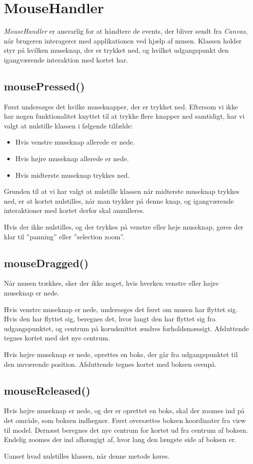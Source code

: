 \section{MouseHandler}
\emph{MouseHandler} er ansvarlig for at håndtere de events, der bliver sendt fra \emph{Canvas}, når brugeren interagerer med applikationen ved hjælp af musen. Klassen holder styr på hvilken museknap, der er trykket ned, og hvilket udgangspunkt den igangværende interaktion med kortet har.

\subsection{mousePressed()}
Først undersøges det hvilke museknapper, der er trykket ned. Eftersom vi ikke har nogen funktionalitet knyttet til at trykke flere knapper ned samtidigt, har vi valgt at nulstille klassen i følgende tilfælde:

\begin{itemize}
	\item Hvis venstre museknap allerede er nede.
	\item Hvis højre museknap allerede er nede.
	\item Hvis midterste museknap trykkes ned.
\end{itemize}

Grunden til at vi har valgt at nulstille klassen når midterste museknap trykkes ned, er at kortet nulstilles, når man trykker på denne knap, og igangværende interaktioner med kortet derfor skal annulleres.

Hvis der ikke nulstilles, og der trykkes på venstre eller høje museknap, gøres der klar til ''panning'' eller ''selection zoom''.

\subsection{mouseDragged()}
Når musen trækkes, sker der ikke noget, hvis hverken venstre eller højre museknap er nede.

Hvis venstre museknap er nede, undersøges det først om musen har flyttet sig. Hvis den har flyttet sig, beregnes det, hvor langt den har flyttet sig fra udgangspunktet, og centrum på korudsnittet ændres forholdsmæssigt. Afsluttende tegnes kortet med det nye centrum.

Hvis højre museknap er nede, oprettes en boks, der går fra udgangspunktet til den nuværende position. Afsluttende tegnes kortet med boksen ovenpå.

\subsection{mouseReleased()}
Hvis højre museknap er nede, og der er oprettet en boks, skal der zoomes ind på det område, som boksen indhegner. Først oversættes boksen koordinater fra view til model. Dernæst beregnes det nye centrum for kortet ud fra centrum af boksen. Endelig zoomes der ind afhængigt af, hvor lang den længste side af boksen er.

Uanset hvad nulstilles klassen, når denne metode køres.